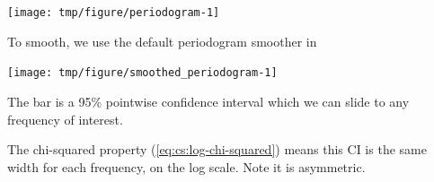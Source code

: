 \begin{frame}[fragile]

\begin{knitrout}\small
{}\color{fgcolor}\begin{kframe}
\begin{alltt}
 \hldef{=}\hldef{)}
\end{alltt}
\end{kframe}

{\centering \texttt{[image: tmp/figure/periodogram-1]} 

}


\end{knitrout}

\bi
\item  To smooth, we use the default periodogram smoother in {\Rlanguage}
\ei

\end{frame}


\begin{frame}[fragile]

\vspace{-3mm}

\begin{knitrout}\small
{}\color{fgcolor}\begin{kframe}
\begin{alltt}
 \hldef{=}\hldef{(}\hldef{,}\hldef{,}\hldef{),} \hldef{=}\hldef{,}
  \hldef{=}\hldef{(}\hldef{,}\hldef{))}
\end{alltt}
\end{kframe}
\end{knitrout}

\vspace{-4mm}

\begin{knitrout}\small
{}\color{fgcolor}

{\centering \texttt{[image: tmp/figure/smoothed\_periodogram-1]} 

}


\end{knitrout}
\bi
\item The bar is a 95\% pointwise confidence interval which we can slide to any frequency of interest.
\item The chi-squared property (\ref{eq:cs:log-chi-squared}) means this CI is the same width for each frequency, on the log scale. Note it is asymmetric.
\ei
\end{frame}


